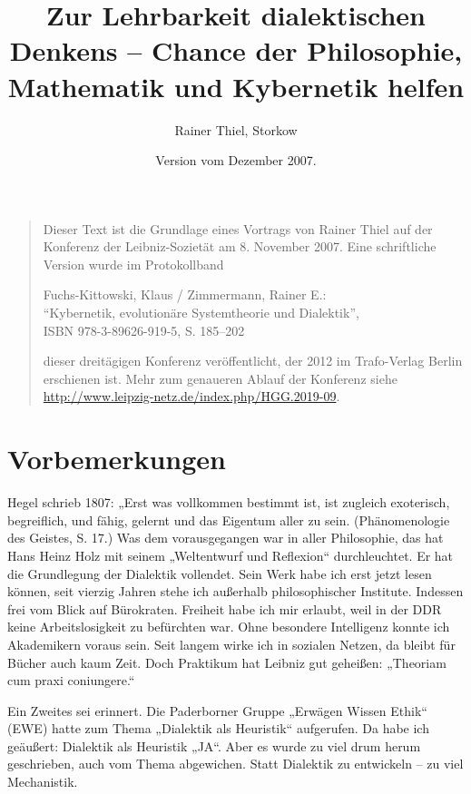 \documentclass[11pt,a4paper]{article}
\title{Zur Lehrbarkeit dialektischen Denkens – Chance der
  Philosophie, Mathematik und Kybernetik helfen}
\author{Rainer Thiel, Storkow}
\date{Version vom Dezember 2007.}
\begin{document}
\maketitle

\begin{quote}
  Dieser Text ist die Grundlage eines Vortrags von Rainer Thiel auf der
  Konferenz der Leibniz-Sozietät am 8. November 2007. Eine schriftliche
  Version wurde im Protokollband
  
  Fuchs-Kittowski, Klaus / Zimmermann, Rainer E.:\\ “Kybernetik, evolutionäre
  Systemtheorie und Dialektik”,\\ ISBN 978-3-89626-919-5, S. 185--202
  
  dieser dreitägigen Konferenz veröffentlicht, der 2012 im Trafo-Verlag Berlin
  erschienen ist.  Mehr zum genaueren Ablauf der Konferenz
  siehe\\ \url{http://www.leipzig-netz.de/index.php/HGG.2019-09}.
\end{quote}

\section{Vorbemerkungen}

Hegel schrieb 1807: „Erst was vollkommen bestimmt ist, ist zugleich
exoterisch, begreiflich, und fähig, gelernt und das Eigentum aller zu sein.
(Phänomenologie des Geistes, S. 17.) Was dem vorausgegangen war in aller
Philosophie, das hat Hans Heinz Holz mit seinem „Weltentwurf und Reflexion“
durchleuchtet. Er hat die Grundlegung der Dialektik vollendet. Sein Werk habe
ich erst jetzt lesen können, seit vierzig Jahren stehe ich außerhalb
philosophischer Institute. Indessen frei vom Blick auf Bürokraten. Freiheit
habe ich mir erlaubt, weil in der DDR keine Arbeitslosigkeit zu befürchten
war. Ohne besondere Intelligenz konnte ich Akademikern voraus sein. Seit
langem wirke ich in sozialen Netzen, da bleibt für Bücher auch kaum Zeit. Doch
Praktikum hat Leibniz gut geheißen: „Theoriam cum praxi coniungere.“

Ein Zweites sei erinnert. Die Paderborner Gruppe „Erwägen Wissen Ethik“ (EWE)
hatte zum Thema „Dialektik als Heuristik“ aufgerufen. Da habe ich geäußert:
Dialektik als Heuristik „JA“. Aber es wurde zu viel drum herum geschrieben,
auch vom Thema abgewichen. Statt Dialektik zu entwickeln – zu viel
Mechanistik.
\end{document}
